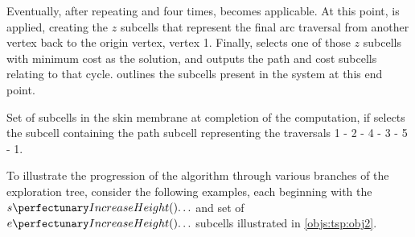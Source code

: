 Eventually, after repeating  and  four times,  becomes applicable.  At this point,  is applied, creating the \(z\) subcells that represent the final arc traversal from another vertex back to the origin vertex, vertex 1.  Finally,  selects one of those \(z\) subcells with minimum cost as the solution, and outputs the path and cost subcells relating to that cycle.   outlines the subcells present in the system at this end point.

\begin{cpobjectsfloat}
\begin{cpobjects}
\end{cpobjects}
\caption[Set of subcells in the skin membrane at completion of the computation]{\label{objs:tsp:obj4}Set of subcells in the skin membrane at completion of the computation, if  selects the subcell containing the path subcell representing the traversals 1 - 2 - 4 - 3 - 5 - 1.}
\end{cpobjectsfloat}

To illustrate the progression of the algorithm through various branches of the exploration tree, consider the following examples, each beginning with the \(\cpfunc{s}{\ldots}\) and set of \(\cpfunc{e}{\ldots}\) subcells illustrated in \cref{objs:tsp:obj2}.

